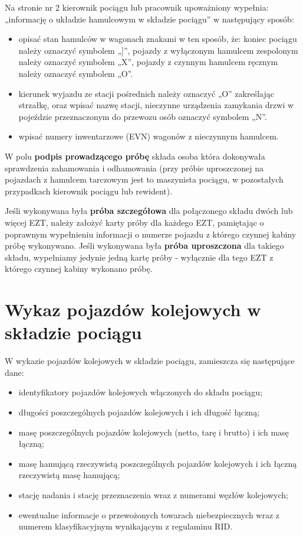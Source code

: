 Na stronie nr 2 kierownik pociągu lub pracownik upoważniony wypełnia: „informację o układzie hamulcowym w składzie pociągu” w następujący sposób:
\begin{itemize}
	\item opisać stan hamulców w wagonach znakami w ten sposób, że: koniec pociągu należy oznaczyć symbolem „]”,
	pojazdy z wyłączonym hamulcem zespolonym należy oznaczyć symbolem „X”, 
	pojazdy z czynnym hamulcem ręcznym należy oznaczyć symbolem „O”.
	\item kierunek wyjazdu ze stacji pośrednich należy oznaczyć „O” zakreślając strzałkę, oraz wpisać nazwę stacji, nieczynne urządzenia zamykania drzwi w pojeździe przeznaczonym do 	przewozu osób oznaczyć symbolem „N”.
	\item wpisać numery inwentarzowe (EVN) wagonów z nieczynnym hamulcem.
\end{itemize}

W polu \textbf{podpis prowadzącego próbę} składa osoba która dokonywała sprawdzenia zahamowania i odhamowania (przy próbie uproszczonej na pojazdach z hamulcem tarczowym jest to maszynista pociągu, w pozostałych przypadkach kierownik pociągu lub rewident). 

Jeśli wykonywana była \textbf{próba szczegółowa} dla połączonego składu dwóch lub więcej EZT, należy założyć karty próby dla każdego EZT, pamiętając o poprawnym wypełnieniu informacji o numerze pojazdu z którego czynnej kabiny próbę wykonywano. Jeśli wykonywana była \textbf{próba uproszczona} dla takiego składu, wypełniamy jedynie jedną kartę próby - wyłącznie dla tego EZT z którego czynnej kabiny wykonano próbę.

\section{Wykaz pojazdów kolejowych w składzie pociągu}
W wykazie pojazdów kolejowych w składzie pociągu, zamieszcza się następujące dane:

\begin{itemize}
\item identyfikatory pojazdów kolejowych włączonych do składu pociągu;
\item długości poszczególnych pojazdów kolejowych i ich długość łączną;
\item masę poszczególnych pojazdów kolejowych (netto, tarę i brutto) i ich masę łączną;
\item masę hamującą rzeczywistą poszczególnych pojazdów kolejowych i ich łączną rzeczywistą masę hamującą;
\item stację nadania i stację przeznaczenia wraz z numerami węzłów kolejowych;
\item ewentualne informacje o przewożonych towarach niebezpiecznych wraz z numerem klasyfikacyjnym wynikającym z regulaminu RID.
\end{itemize}


